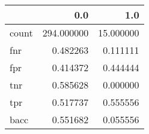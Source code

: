 \begin{tabular}{lrr}
\toprule
{} &         0.0 &        1.0 \\
\midrule
count &  294.000000 &  15.000000 \\
fnr   &    0.482263 &   0.111111 \\
fpr   &    0.414372 &   0.444444 \\
tnr   &    0.585628 &   0.000000 \\
tpr   &    0.517737 &   0.555556 \\
bacc  &    0.551682 &   0.055556 \\
\bottomrule
\end{tabular}
